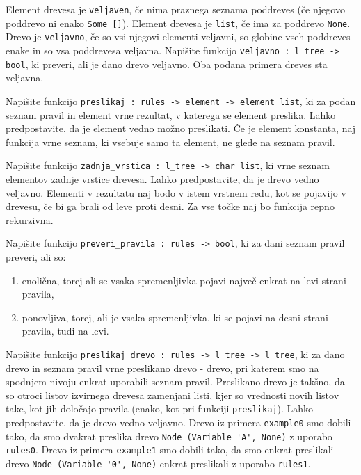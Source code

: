\documentclass[arhiv]{../izpit}
\begin{document}
\podnaloga
Element drevesa je \verb|veljaven|, če nima praznega seznama poddreves (če njegovo poddrevo ni enako \verb|Some []|).
Element drevesa je \verb|list|, če ima za poddrevo \verb|None|.
Drevo je \verb|veljavno|, če so vsi njegovi elementi veljavni, so globine vseh poddreves enake in so vsa poddrevesa veljavna.
Napišite funkcijo \verb|veljavno : l_tree -> bool|, ki preveri, ali je dano drevo veljavno.
Oba podana primera dreves sta veljavna.


\podnaloga
Napišite funkcijo \verb|preslikaj : rules -> element -> element list|, ki za podan seznam pravil in element vrne rezultat, v katerega se element preslika.
Lahko predpostavite, da je element vedno možno preslikati.
Če je element konstanta, naj funkcija vrne seznam, ki vsebuje samo ta element, ne glede na seznam pravil.

\podnaloga
Napišite funkcijo \verb|zadnja_vrstica : l_tree -> char list|, ki vrne seznam elementov zadnje vrstice drevesa.
Lahko predpostavite, da je drevo vedno veljavno.
Elementi v rezultatu naj bodo v istem vrstnem redu, kot se pojavijo v drevesu, če bi ga brali od leve proti desni.
Za vse točke naj bo funkcija repno rekurzivna.

\podnaloga
Napišite funkcijo \verb|preveri_pravila : rules -> bool|, ki za dani seznam pravil preveri, ali so:
\begin{enumerate}
  \item enolična, torej ali se vsaka spremenljivka pojavi največ enkrat na levi strani pravila,
  \item ponovljiva, torej, ali je vsaka spremenljivka, ki se pojavi na desni strani pravila, tudi na levi.
\end{enumerate}

\podnaloga
Napišite funkcijo \verb|preslikaj_drevo : rules -> l_tree -> l_tree|, ki za dano drevo in seznam pravil vrne preslikano drevo - drevo, pri katerem smo na spodnjem nivoju enkrat uporabili seznam pravil.
Preslikano drevo je takšno, da so otroci listov izvirnega drevesa zamenjani listi, kjer so vrednosti novih listov take, kot jih določajo pravila (enako, kot pri funkciji \verb|preslikaj|).
Lahko predpostavite, da je drevo vedno veljavno.
Drevo iz primera \verb|example0| smo dobili tako, da smo dvakrat preslika drevo \verb|Node (Variable 'A', None)| z uporabo \verb|rules0|.
Drevo iz primera \verb|example1| smo dobili tako, da smo enkrat preslikali drevo \verb|Node (Variable '0', None)| enkrat preslikali z uporabo \verb|rules1|.

\end{document}
